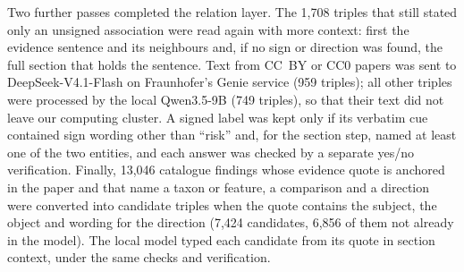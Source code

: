 \documentclass[referee,lineno,pdflatex,sn-vancouver-num]{sn-jnl}
\theoremstyle{thmstyleone}%
\theoremstyle{thmstyletwo}%
\theoremstyle{thmstylethree}%
\begin{document}
Two further passes completed the relation layer. The 1,708 triples that
still stated only an unsigned association were read again with more
context: first the evidence sentence and its neighbours and, if no sign or
direction was found, the full section that holds the sentence. Text from
CC~BY or CC0 papers was sent to DeepSeek-V4.1-Flash on Fraunhofer's Genie
service (959 triples); all other triples were processed by the local
Qwen3.5-9B (749 triples), so that their text did not leave our computing
cluster. A signed label was kept only if its verbatim cue contained sign
wording other than ``risk'' and, for the section step, named at least one
of the two entities, and each answer was checked by a separate yes/no
verification. Finally, 13,046 catalogue findings whose evidence quote is
anchored in the paper and that name a taxon or feature, a comparison and a
direction were converted into candidate triples when the quote contains
the subject, the object and wording for the direction (7,424 candidates,
6,856 of them not already in the model). The local model typed each
candidate from its quote in section context, under the same checks and
verification.
\end{document}
